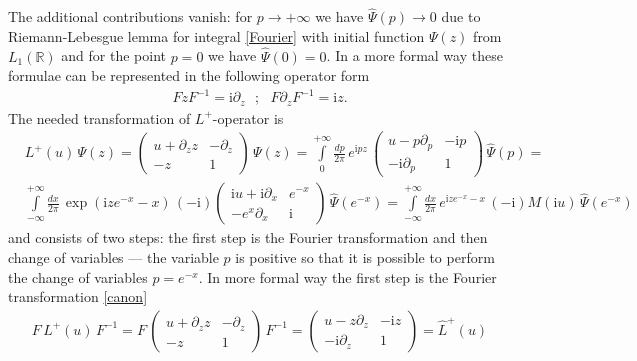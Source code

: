\documentclass[11pt]{article}
\numberwithin{equation}{section}
\theoremstyle{plain}
\theoremstyle{definition}
\def\dd{\partial}
\renewcommand{\imath}{\mathrm{i}}
\begin{document}
The additional contributions vanish: 
for $p \to+\infty$ we have $\hat{\Psi}(p) \to 0$ due 
to Riemann-Lebesgue lemma for integral \eqref{Fourier} with 
initial function $\Psi(z)$ from $L_1(\mathbb{R})$ and 
for the point $p=0$ we have $\hat{\Psi}(0) = 0$. 
In a more formal way these formulae can be represented
in the following operator form
\begin{align}\label{canon} 
	F z F^{-1} =  \imath\partial_z \ \ \ ;\ \ \ F \partial_z F^{-1} = \imath z.
\end{align}
The needed transformation of $L^+$-operator is  
\begin{align*}
	&L^+(u)\,\Psi(z) = \left(\begin{array}{cc}
		u + \dd_z z & -\dd_z \\
		-z& 1\end{array}\right)\,\Psi(z) = 
	\int\limits_{0}^{+\infty} \frac{d p}{2\pi}\, e^{\imath pz}\, 
	\left(\begin{array}{cc}
		u - p\partial_p & -\imath p  \\
		-\imath\partial_p & 1\end{array}\right)\,\hat{\Psi}(p) = \\
	&\int\limits_{-\infty}^{+\infty} \frac{d x}{2\pi}\, 
	\exp(\imath ze^{-x} - x)\, 
	(-\imath)\left(\begin{array}{cc}
		\imath u + \imath\partial_x & e^{-x}  \\
		-e^{x}\partial_x & \imath\end{array}\right)\,\hat{\Psi}(e^{-x}) = 
	\int\limits_{-\infty}^{+\infty} \frac{d x}{2\pi}\, 
	e^{\imath ze^{-x} - x}\, 
	(-\imath) M(\imath u) \,\hat{\Psi}(e^{-x})
\end{align*}
and consists of two steps: the first step is the Fourier transformation and then 
change of variables --- the variable $p$ is positive so 
that it is possible to perform the change of variables $p = e^{-x}$.  
In more formal way the first step is the Fourier transformation \eqref{canon}
\begin{align*}
	F\,L^+(u)\,F^{-1} = F\,\left(\begin{array}{cc}
		u + \dd_z z & -\dd_z \\
		-z& 1\end{array}\right)\,F^{-1}  = 
	\left(\begin{array}{cc}
		u - z\partial_z & -\imath z  \\
		-\imath\partial_z & 1\end{array}\right) = \hat{L}^+(u)
\end{align*}
\end{document}
